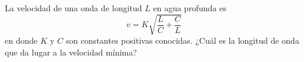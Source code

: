 \item La velocidad de una onda de longitud $L$ en agua profunda es
$$v = K \sqrt{\frac{L}{C} + \frac{C}{L}}$$
en donde $K$ y $C$ son constantes positivas conocidas. ¿Cuál es la longitud de onda que da lugar a la velocidad mínima?

